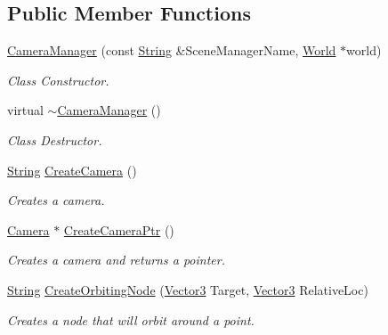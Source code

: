 \subsection*{Public Member Functions}
\begin{DoxyCompactItemize}
\item 
\hyperlink{classphys_1_1CameraManager_a1e659b4a07645965194a33f8439fa4ea}{CameraManager} (const \hyperlink{namespacephys_aa03900411993de7fbfec4789bc1d392e}{String} \&SceneManagerName, \hyperlink{classphys_1_1World}{World} $\ast$world)
\begin{DoxyCompactList}\small\item\em Class Constructor. \item\end{DoxyCompactList}\item 
virtual \hyperlink{classphys_1_1CameraManager_a0b0f032477309eb47b0302fd5eef198c}{$\sim$CameraManager} ()
\begin{DoxyCompactList}\small\item\em Class Destructor. \item\end{DoxyCompactList}\item 
\hyperlink{namespacephys_aa03900411993de7fbfec4789bc1d392e}{String} \hyperlink{classphys_1_1CameraManager_ac6ff80c91fa5a2cd21ebd8b78db9add2}{CreateCamera} ()
\begin{DoxyCompactList}\small\item\em Creates a camera. \item\end{DoxyCompactList}\item 
\hyperlink{classphys_1_1Camera}{Camera} $\ast$ \hyperlink{classphys_1_1CameraManager_ae51f79b63b5c34959bc4cfbef34b8f08}{CreateCameraPtr} ()
\begin{DoxyCompactList}\small\item\em Creates a camera and returns a pointer. \item\end{DoxyCompactList}\item 
\hyperlink{namespacephys_aa03900411993de7fbfec4789bc1d392e}{String} \hyperlink{classphys_1_1CameraManager_a9a696ea09f174a69bbc6d0bb179b3de4}{CreateOrbitingNode} (\hyperlink{classphys_1_1Vector3}{Vector3} Target, \hyperlink{classphys_1_1Vector3}{Vector3} RelativeLoc)
\begin{DoxyCompactList}\small\item\em Creates a node that will orbit around a point. \item\end{DoxyCompactList}\item 

\end{DoxyCompactItemize}
